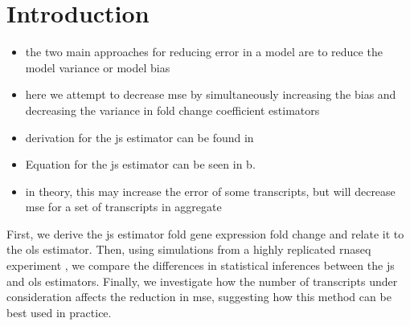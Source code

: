 \section{Introduction}

\begin{itemize}
  \item the two main approaches for reducing error in a model are to reduce the model variance or model bias 
  \item here we attempt to decrease \gls{mse} by simultaneously increasing the bias and decreasing the variance in fold change coefficient estimators
  \item derivation for the \gls{js} estimator can be found in 
  \item Equation for the \gls{js} estimator can be seen in b. 
  \item in theory, this may increase the error of some transcripts, but will decrease \gls{mse} for a set of transcripts in aggregate 
\end{itemize}


First, we derive the \gls{js} estimator fold gene expression fold change and relate it to the \gls{ols} estimator.
Then, using simulations from a highly replicated \gls{rnaseq} experiment \cite{gierlinskiStatisticalModelsRNAseq2015}, we compare the differences in statistical inferences between the \gls{js} and \gls{ols} estimators.
Finally, we investigate how the number of transcripts under consideration affects the reduction in \gls{mse}, suggesting how this method can be best used in practice.
